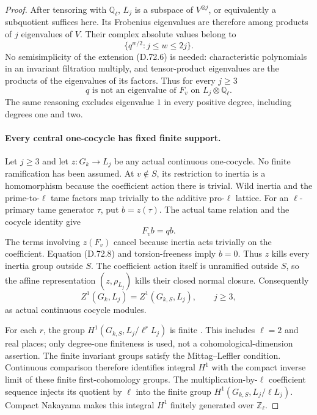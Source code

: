 \begin{proof}
After tensoring with \(\mathbb Q_\ell\), \(L_j\) is a
subspace of \(V^{\otimes j}\), or equivalently a
subquotient suffices here. Its Frobenius eigenvalues are
therefore among products of \(j\) eigenvalues of \(V\).
Their complex absolute values belong to
\[
       \{q^{w/2}: j\le w\le2j\}.                       \tag{D.72.7}
\]
No semisimplicity of the extension (D.72.6) is needed:
characteristic polynomials in an invariant filtration
multiply, and tensor-product eigenvalues are the products
of the eigenvalues of its factors. Thus for every \(j\ge3\)
\[
     q\text{ is not an eigenvalue of }F_v\text{ on }
                                   L_j\otimes\mathbb Q_\ell.
                                                        \tag{D.72.8}
\]
The same reasoning excludes eigenvalue \(1\) in every
positive degree, including degrees one and two.

\paragraph{Every central one-cocycle has fixed finite support.}
Let \(j\ge3\) and let \(z:G_k\to L_j\) be any actual
continuous one-cocycle. No finite ramification has been
assumed. At \(v\notin S\), its restriction to inertia
is a homomorphism because the coefficient action there
is trivial. Wild inertia and the prime-to-\(\ell\) tame
factors map trivially to the additive pro-\(\ell\) lattice.
For an \(\ell\)-primary tame generator \(\tau\), put
\(b=z(\tau)\). The actual tame relation and the cocycle
identity give
\[
                       F_vb=q b.                     \tag{D.72.9}
\]
The terms involving \(z(F_v)\) cancel because inertia
acts trivially on the coefficient. Equation (D.72.8)
and torsion-freeness imply \(b=0\). Thus \(z\) kills
every inertia group outside \(S\). The coefficient
action itself is unramified outside \(S\), so the
affine representation \((z,\rho_{L_j})\) kills their
closed normal closure. Consequently
\[
 Z^1(G_k,L_j)=Z^1(G_{k,S},L_j),\qquad j\ge3,             \tag{D.72.10}
\]
as actual continuous cocycle modules.

For each \(r\), the group
\(H^1(G_{k,S},L_j/\ell^rL_j)\) is finite
\cite[I, Corollary 4.15]{DE_MilneADT}. This includes
\(\ell=2\) and real places; only degree-one finiteness
is used, not a cohomological-dimension assertion.
The finite invariant groups satisfy the
Mittag--Leffler condition. Continuous comparison
\cite[Proposition 1.6 and Theorem 2.2]{DE_Jannsen1988}
therefore identifies integral \(H^1\) with the compact
inverse limit of these finite first-cohomology groups.
The multiplication-by-\(\ell\) coefficient sequence
injects its quotient by \(\ell\) into the finite
group \(H^1(G_{k,S},L_j/\ell L_j)\). Compact Nakayama
makes this integral \(H^1\) finitely generated over
\(\mathbb Z_\ell\).


\end{proof}
